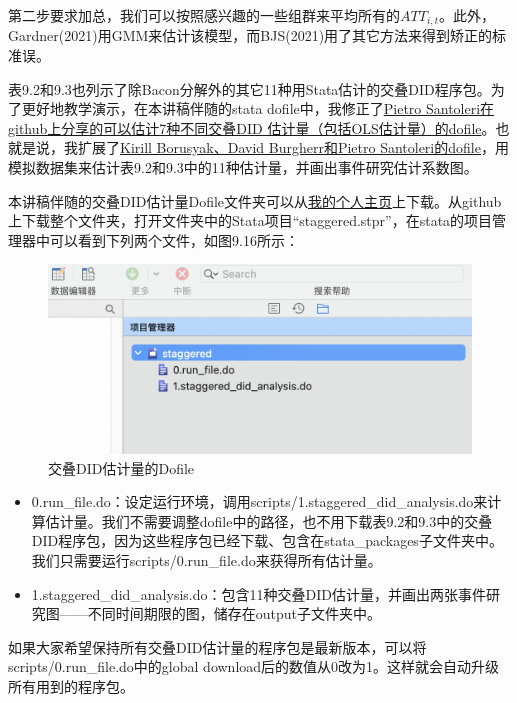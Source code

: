 \documentclass[cn,12pt,math=newtx,citestyle=gb7714-2015,bibstyle=gb7714-2015]{elegantbook}
\begin{document}
	第二步要求加总，我们可以按照感兴趣的一些组群来平均所有的$ATT_{i,t}$。此外，Gardner(2021)用GMM来估计该模型，而BJS(2021)用了其它方法来得到矫正的标准误。
	
	表9.2和9.3也列示了除Bacon分解外的其它11种用Stata估计的交叠DID程序包。为了更好地教学演示，在本讲稿伴随的stata dofile中，我修正了\href{https://github.com/pietrosantoleri/staggered_did}{Pietro Santoleri在github上分享的可以估计7种不同交叠DID 估计量（包括OLS估计量）的dofile}。也就是说，我扩展了\href{https://github.com/pietrosantoleri/staggered_did}{Kirill Borusyak、David Burgherr和Pietro Santoleri的dofile}，用模拟数据集来估计表9.2和9.3中的11种估计量，并画出事件研究估计系数图。
	
	本讲稿伴随的交叠DID估计量Dofile文件夹可以从\href{https://wenddymacro.github.io/Wenddy-XU/}{我的个人主页}上下载。从github上下载整个文件夹，打开文件夹中的Stata项目“staggered.stpr”，在stata的项目管理器中可以看到下列两个文件，如图9.16所示：
	
	\begin{figure}[tbph]
		\centering
		\includegraphics[width=1\linewidth]{project_manager}
		\caption{交叠DID估计量的Dofile}
		\label{fig:project_manager}
	\end{figure}
	
	\begin{itemize}
		\item 0.run\_file.do：设定运行环境，调用scripts/1.staggered\_did\_analysis.do来计算估计量。我们不需要调整dofile中的路径，也不用下载表9.2和9.3中的交叠DID程序包，因为这些程序包已经下载、包含在stata\_packages子文件夹中。我们只需要运行scripts/0.run\_file.do来获得所有估计量。
		\item 1.staggered\_did\_analysis.do：包含11种交叠DID估计量，并画出两张事件研究图——不同时间期限的图，储存在output子文件夹中。
	\end{itemize}
	
	如果大家希望保持所有交叠DID估计量的程序包是最新版本，可以将scripts/0.run\_file.do中的global download后的数值从0改为1。这样就会自动升级所有用到的程序包。
	
\end{document}
